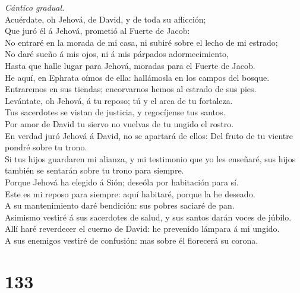  \emph{Cántico gradual.}\\
Acuérdate, oh Jehová, de David, y de toda su aflicción;\\
 Que juró él á Jehová, prometió al Fuerte de Jacob:\\
 No entraré en la morada de mi casa, ni subiré sobre el
lecho de mi estrado;\\
 No daré sueño á mis ojos, ni á mis párpados
adormecimiento,\\
 Hasta que halle lugar para Jehová, moradas para el Fuerte
de Jacob.\\
 He aquí, en Ephrata oímos de ella: hallámosla en los campos
del bosque.\\
 Entraremos en sus tiendas; encorvarnos hemos al estrado de
sus pies.\\
 Levántate, oh Jehová, á tu reposo; tú y el arca de tu
fortaleza.\\
 Tus sacerdotes se vistan de justicia, y regocíjense tus
santos.\\
 Por amor de David tu siervo no vuelvas de tu ungido el
rostro.\\
 En verdad juró Jehová á David, no se apartará de ellos:
Del fruto de tu vientre pondré sobre tu trono.\\
 Si tus hijos guardaren mi alianza, y mi testimonio que yo
les enseñaré, sus hijos también se sentarán sobre tu trono para
siempre.\\
 Porque Jehová ha elegido á Sión; deseóla por habitación
para sí.\\
 Este es mi reposo para siempre: aquí habitaré, porque la
he deseado.\\
 A su mantenimiento daré bendición: sus pobres saciaré de
pan.\\
 Asimismo vestiré á sus sacerdotes de salud, y sus santos
darán voces de júbilo.\\
 Allí haré reverdecer el cuerno de David: he prevenido
lámpara á mi ungido.\\
 A sus enemigos vestiré de confusión: mas sobre él
florecerá su corona.

\hypertarget{section-132}{%
\section{133}\label{section-132}}

